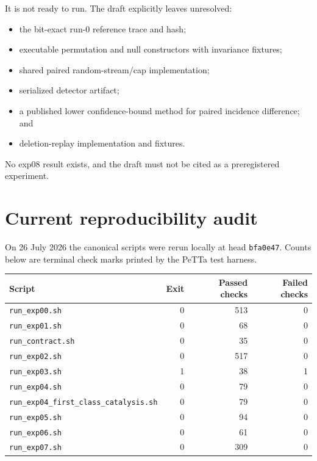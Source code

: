 \documentclass[11pt]{article}
\newcommand{\code}[1]{\texttt{#1}}
\begin{document}
It is not ready to run.  The draft explicitly leaves unresolved:

\begin{itemize}
\item the bit-exact run-0 reference trace and hash;
\item executable permutation and null constructors with invariance fixtures;
\item shared paired random-stream/cap implementation;
\item serialized detector artifact;
\item a published lower confidence-bound method for paired incidence
  difference; and
\item deletion-replay implementation and fixtures.
\end{itemize}

No exp08 result exists, and the draft must not be cited as a preregistered
experiment.

\section{Current reproducibility audit}
\label{sec:repro}

On 26 July 2026 the canonical scripts were rerun locally at head
\code{bfa0e47}.  Counts below are terminal check marks printed by the PeTTa
test harness.

\begin{center}
\begin{tabular}{lrrr}
\toprule
Script & Exit & Passed checks & Failed checks \\
\midrule
\code{run\_exp00.sh} & 0 & 513 & 0 \\
\code{run\_exp01.sh} & 0 & 68 & 0 \\
\code{run\_contract.sh} & 0 & 35 & 0 \\
\code{run\_exp02.sh} & 0 & 517 & 0 \\
\code{run\_exp03.sh} & 1 & 38 & 1 \\
\code{run\_exp04.sh} & 0 & 79 & 0 \\
\code{run\_exp04\_first\_class\_catalysis.sh} & 0 & 79 & 0 \\
\code{run\_exp05.sh} & 0 & 94 & 0 \\
\code{run\_exp06.sh} & 0 & 61 & 0 \\
\code{run\_exp07.sh} & 0 & 309 & 0 \\
\bottomrule
\end{tabular}
\end{center}
\end{document}

